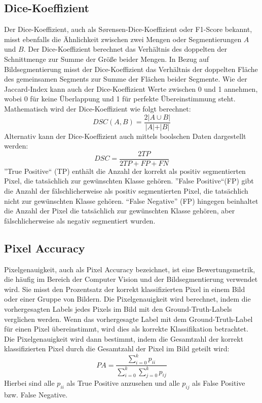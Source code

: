 \subsection{Dice-Koeffizient}
\label{subsec:DiceKoeffizient}
Der Dice-Koeffizient, auch als Sørensen-Dice-Koeffizient oder F1-Score bekannt, misst ebenfalls die Ähnlichkeit zwischen zwei Mengen oder Segmentierungen $A$ und $B$. Der Dice-Koeffizient berechnet das Verhältnis des doppelten der Schnittmenge zur Summe der Größe beider Mengen. In Bezug auf Bildsegmentierung misst der Dice-Koeffizient das Verhältnis der doppelten Fläche des gemeinsamen Segments zur Summe der Flächen beider Segmente. Wie der Jaccard-Index kann auch der Dice-Koeffizient Werte zwischen 0 und 1 annehmen, wobei 0 für keine Überlappung und 1 für perfekte Übereinstimmung steht. Mathematisch wird der Dice-Koeffizient wie folgt berechnet:
\begin{equation}
	DSC(A,B) =  \dfrac{2 \vert A \cup B\vert }{\vert A \vert + \vert B\vert}
\end{equation} 
Alternativ kann der Dice-Koeffizient auch mittels boolschen Daten dargestellt werden:
\begin{equation}
	DSC={\frac {2TP}{2TP+FP+FN}}
\end{equation}
''True Positive`` (TP) enthält die Anzahl der korrekt als positiv segmentierten Pixel, die tatsächlich zur gewünschten Klasse gehören. ''False Positive``(FP) gibt die Anzahl der fälschlicherweise als positiv segmentierten Pixel, die tatsächlich nicht zur gewünschten Klasse gehören. ``False Negative'' (FP) hingegen beinhaltet die Anzahl der Pixel die tatsächlich zur gewünschten Klasse gehören, aber fälschlicherweise als negativ segmentiert wurden. \cite[vgl.][]{Dice1945}


\subsection{Pixel Accuracy}
Pixelgenauigkeit, auch als Pixel Accuracy bezeichnet, ist eine Bewertungsmetrik, die häufig im Bereich der Computer Vision und der Bildsegmentierung verwendet wird. Sie misst den Prozentsatz der korrekt klassifizierten Pixel in einem Bild oder einer Gruppe von Bildern.
Die Pixelgenauigkeit wird berechnet, indem die vorhergesagten Labels jedes Pixels im Bild mit den Ground-Truth-Labels verglichen werden. Wenn das vorhergesagte Label mit dem Ground-Truth-Label für einen Pixel übereinstimmt, wird dies als korrekte Klassifikation betrachtet. Die Pixelgenauigkeit wird dann bestimmt, indem die Gesamtzahl der korrekt klassifizierten Pixel durch die Gesamtzahl der Pixel im Bild geteilt wird:
\begin{equation}
	PA = \dfrac{\sum_{i=0}^{k} p_{ii}}{\sum_{i=0}^{k} \sum_{j=0}^{k} p_{ij}}
\end{equation}
Hierbei sind alle $p_{ii}$ als True Positive anzusehen und alle $p_{ij}$ als False Positive bzw. False Negative. \cite[vgl.][]{Hurtado2022}

